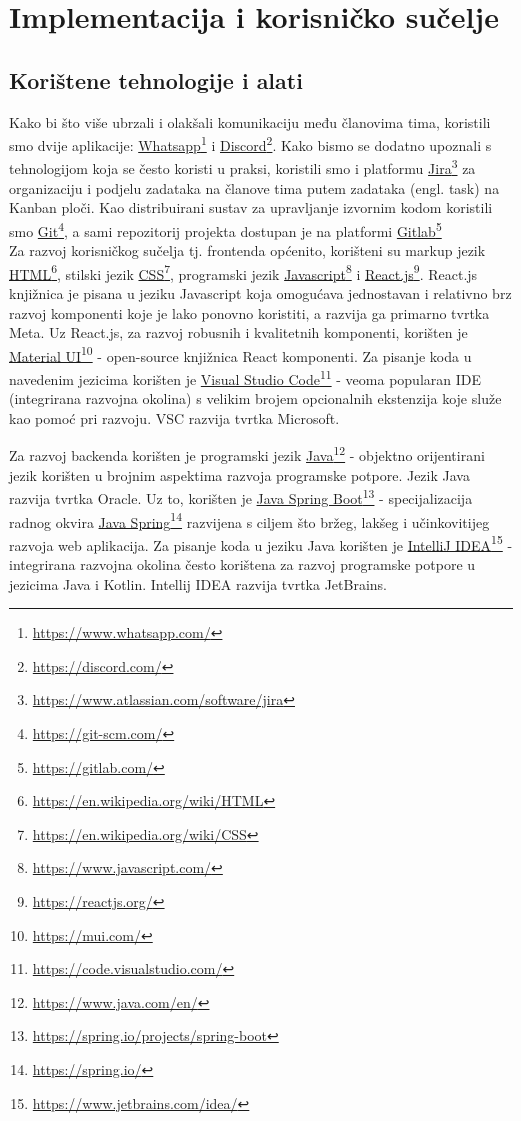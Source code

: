 \chapter{Implementacija i korisničko sučelje}
		
		
		\section{Korištene tehnologije i alati}
		
			Kako bi što više ubrzali i olakšali komunikaciju među članovima tima, koristili smo dvije aplikacije: \underline{Whatsapp}\footnote{\url{https://www.whatsapp.com/}} i \underline{Discord}\footnote{\url{https://discord.com/}}. Kako bismo se dodatno upoznali s tehnologijom koja se često koristi u praksi, koristili smo i platformu \underline{Jira}\footnote{\url{https://www.atlassian.com/software/jira}} za organizaciju i podjelu zadataka na članove tima putem zadataka (engl. task) na Kanban ploči. Kao distribuirani sustav za upravljanje izvornim kodom koristili smo \underline{Git}\footnote{\url{https://git-scm.com/}}, a sami repozitorij projekta dostupan je na platformi \underline{Gitlab}\footnote{\url{https://gitlab.com/}}\\

            Za razvoj korisničkog sučelja tj. frontenda općenito, korišteni su markup jezik \underline{HTML}\footnote{\url{https://en.wikipedia.org/wiki/HTML}}, stilski jezik \underline{CSS}\footnote{\url{https://en.wikipedia.org/wiki/CSS}}, programski jezik \underline{Javascript}\footnote{\url{https://www.javascript.com/}} i \underline{React.js}\footnote{\url{https://reactjs.org/}}. React.js knjižnica je pisana u jeziku Javascript koja omogućava jednostavan i relativno brz razvoj komponenti koje je lako ponovno koristiti, a razvija ga primarno tvrtka Meta. Uz React.js, za razvoj robusnih i kvalitetnih komponenti, korišten je \underline{Material UI}\footnote{\url{https://mui.com/}} - open-source knjižnica React komponenti. Za pisanje koda u navedenim jezicima korišten je \underline{Visual Studio Code}\footnote{\url{https://code.visualstudio.com/}} - veoma popularan IDE (integrirana razvojna okolina) s velikim brojem opcionalnih ekstenzija koje služe kao pomoć pri razvoju. VSC razvija tvrtka Microsoft. \\

            \eject

            Za razvoj backenda korišten je programski jezik \underline{Java}\footnote{\url{https://www.java.com/en/}} - objektno orijentirani jezik korišten u brojnim aspektima razvoja programske potpore. Jezik Java razvija tvrtka Oracle. Uz to, korišten je \underline{Java Spring Boot}\footnote{\url{https://spring.io/projects/spring-boot}} - specijalizacija radnog okvira \underline{Java Spring}\footnote{\url{https://spring.io/}} razvijena s ciljem što bržeg, lakšeg i učinkovitijeg razvoja web aplikacija. Za pisanje koda u jeziku Java korišten je \underline{IntelliJ IDEA}\footnote{\url{https://www.jetbrains.com/idea/}} - integrirana razvojna okolina često korištena za razvoj programske potpore u jezicima Java i Kotlin. Intellij IDEA razvija tvrtka JetBrains. \\

